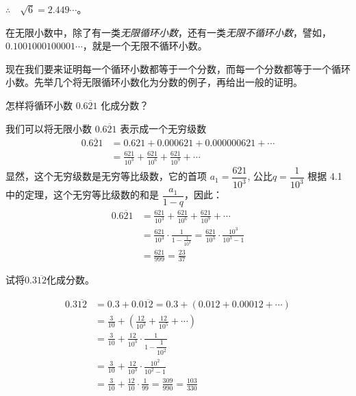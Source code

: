 $\therefore\quad \sqrt{6}=2.449\cdots$。

在无限小数中，除了有一类\emph{无限循环小数}，还有一类\emph{无限不循环小数}，譬如，$0.1001000100001\cdots$，就是一个无限不循环小数。

现在我们要来证明每一个循环小数都等于一个分数，而每一个分数都等于一个循环小数。先举几个将无限循环小数化为分数的例子，再给出一般的证明。

\begin{example}
  怎样将循环小数 $0.\overline{621}$ 化成分数？
\end{example}

\begin{solution}
  我们可以将无限小数 $0.\overline{621}$ 表示成一个无穷级数
\[\begin{split}
0.\overline{621}&=0.621+0.000621+0.000000621+\cdots\\
&=\frac{621}{10^3}+\frac{621}{10^6}+\frac{621}{10^9}+\cdots
\end{split}\]
显然，这个无穷级数是无穷等比级数，它的首项 $a_1=\dfrac{621}{10^3}$, 公比$q=\dfrac{1}{10^3}$ 根据 4.1 中的定理，这个无穷等比级数的和是 $\dfrac{a_1}{1-q}$，因此：
\[\begin{split}
    0.\overline{621}&=\frac{621}{10^3}+\frac{621}{10^6}+\frac{621}{10^9}+\cdots\\
    &=\frac{621}{10^3}\cdot \frac{1}{1-\frac{1}{10^3}}=\frac{621}{10^3}\cdot \frac{10^3}{10^3-1}\\
    &=\frac{621}{999}=\frac{23}{37}
\end{split}\]
\end{solution}

\begin{example}
试将$0.3\overline{12}$化成分数。
\end{example}

\begin{solution}
\[\begin{split}
    0.3\overline{12}&= 0.3+0.0\overline{12}=0.3+(0.012+0.00012+\cdots)\\
    &=\frac{3}{10}+\left(\frac{12}{10^3}+\frac{12}{10^5}+\cdots\right)\\
    &=\frac{3}{10}+\frac{12}{10^3}\cdot \frac{1}{1-\dfrac{1}{10^2}}\\
    &=\frac{3}{10}+\frac{12}{10^3}\cdot \frac{10^2}{10^2-1}\\
    &=\frac{3}{10}+\frac{12}{10}\cdot \frac{1}{99}=\frac{309}{990}=\frac{103}{330}
\end{split}\]
\end{solution}

